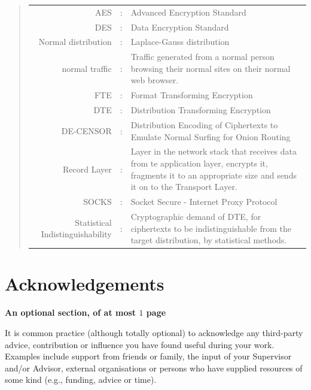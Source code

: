 \documentclass[ %
                    author={Samuel Russell},
                supervisor={Prof. Bogdan Warinschi},
                    degree={MEng},
                     title={Innocuous Ciphertexts},
                  subtitle={The DE-CENSOR Scheme},
                      type={research},
                      year={2018} ]{dissertation}
\begin{document}
\begin{quote}
\noindent
\begin{tabularx}{\textwidth}{ r c X }
AES                 &:		& Advanced Encryption Standard                                         \\
DES                 &:		& Data Encryption Standard                                             \\
Normal distribution &:		& Laplace-Gauss distribution
\\
normal traffic		&:		& Traffic generated from a normal person
browsing their normal sites on their normal web browser.\\
FTE					&:		& Format Transforming Encryption\\
DTE					&:		& Distribution Transforming Encryption\\
DE-CENSOR			&:		& Distribution Encoding of Ciphertexts to Emulate Normal Surfing for Onion Routing\\
Record Layer		&:		& Layer in the network stack that receives data from te application layer, encrypts it, fragments it to an appropriate size and sends it on to the Transport Layer.\\
SOCKS				&:		& Socket Secure - Internet Proxy Protocol\\
Statistical Indistinguishability&:& Cryptographic demand of DTE, for ciphertexts to be indistinguishable from the target distribution, by statistical methods.\\

\end{tabularx}
\end{quote}


\chapter*{Acknowledgements}

{\bf An optional section, of at most $1$ page}
\vspace{1cm} 

\noindent
It is common practice (although totally optional) to acknowledge any
third-party advice, contribution or influence you have found useful
during your work.  Examples include support from friends or family, 
the input of your Supervisor and/or Advisor, external organisations 
or persons who  have supplied resources of some kind (e.g., funding, 
advice or time).
\end{document}
